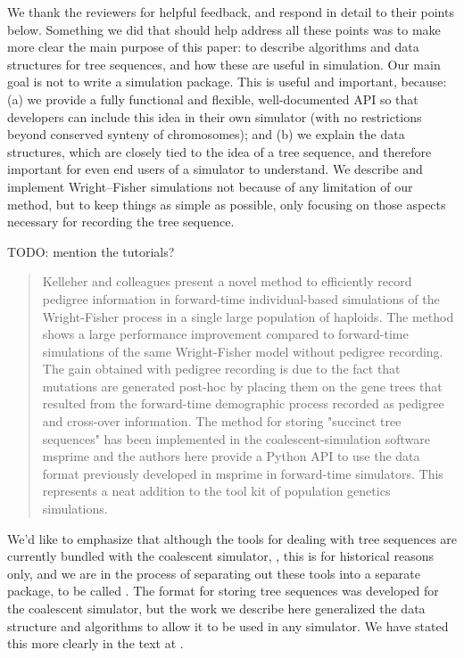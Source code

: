 We thank the reviewers for helpful feedback, and respond in detail to their points below.
Something we did that should help address all these points
was to make more clear the main purpose of this paper:
to describe algorithms and data structures for tree sequences,
and how these are useful in simulation.
Our main goal is not to write a simulation package.
This is useful and important, because: 
(a) we provide a fully functional and flexible, well-documented API
so that developers can include this idea in their own simulator
(with no restrictions beyond conserved synteny of chromosomes); and
(b) we explain the data structures,
which are closely tied to the idea of a tree sequence,
and therefore important for even end users of a simulator to understand.
We describe and implement Wright--Fisher simulations not because of any limitation of our method,
but to keep things as simple as possible, only focusing on those aspects necessary 
for recording the tree sequence.

TODO: mention the tutorials?


\begin{quote}
    Kelleher and colleagues present a novel method to efficiently record pedigree
    information in forward-time individual-based simulations of the Wright-Fisher
    process in a single large population of haploids. The method shows a large
    performance improvement compared to forward-time simulations of the same
    Wright-Fisher model without pedigree recording. The gain obtained with pedigree
    recording is due to the fact that mutations are generated post-hoc by placing
    them on the gene trees that resulted from the forward-time demographic process
    recorded as pedigree and cross-over information. The method for storing
    "succinct tree sequences" has been implemented in the coalescent-simulation
    software msprime and the authors here provide a Python API to use the data
    format previously developed in msprime in forward-time simulators. This
    represents a neat addition to the tool kit of population genetics simulations.
\end{quote}

We'd like to emphasize that although the tools for dealing with tree sequences
are currently bundled with the coalescent simulator, \msprime{},
this is for historical reasons only, 
and we are in the process of separating out these tools into a separate package,
to be called \tskit.
The format for storing tree sequences was developed for the coalescent simulator,
but the work we describe here generalized the data structure and algorithms
to allow it to be used in any simulator.
We have stated this more clearly in the text at .

